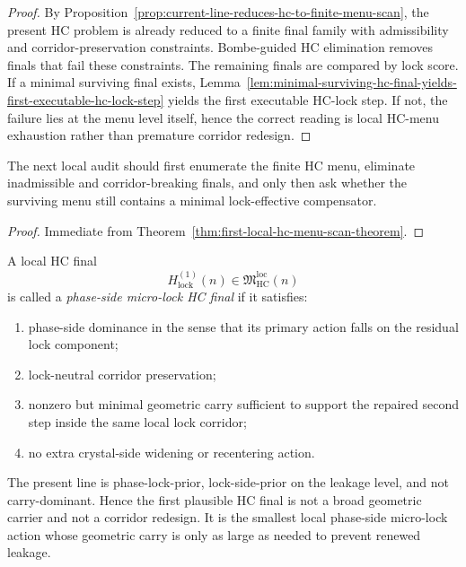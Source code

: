\begin{proof}
By Proposition~\ref{prop:current-line-reduces-hc-to-finite-menu-scan}, the present HC problem is already reduced to a finite final family with admissibility and corridor-preservation constraints. Bombe-guided HC elimination removes finals that fail these constraints. The remaining finals are compared by lock score. If a minimal surviving final exists, Lemma~\ref{lem:minimal-surviving-hc-final-yields-first-executable-hc-lock-step} yields the first executable HC-lock step. If not, the failure lies at the menu level itself, hence the correct reading is local HC-menu exhaustion rather than premature corridor redesign.
\end{proof}

\begin{corollary}
\label{cor:current-hc-menu-scan-working-rule}
The next local audit should first enumerate the finite HC menu, eliminate inadmissible and corridor-breaking finals, and only then ask whether the surviving menu still contains a minimal lock-effective compensator.
\end{corollary}

\begin{proof}
Immediate from Theorem~\ref{thm:first-local-hc-menu-scan-theorem}.
\end{proof}



\begin{definition}
\label{def:phase-side-micro-lock-hc-final}
A local HC final
\[
 H_{\mathrm{lock}}^{(1)}(n)\in \mathfrak M_{\mathrm{HC}}^{\mathrm{loc}}(n)
\]
is called a \emph{phase-side micro-lock HC final} if it satisfies:
\begin{enumerate}[leftmargin=2em,label=(\alph*)]
 \item phase-side dominance in the sense that its primary action falls on the residual lock component;
 \item lock-neutral corridor preservation;
 \item nonzero but minimal geometric carry sufficient to support the repaired second step inside the same local lock corridor;
 \item no extra crystal-side widening or recentering action.
\end{enumerate}
\end{definition}

\begin{remark}
\label{rem:why-this-is-the-first-plausible-hc-menu-entry}
The present line is phase-lock-prior, lock-side-prior on the leakage level, and not carry-dominant. Hence the first plausible HC final is not a broad geometric carrier and not a corridor redesign. It is the smallest local phase-side micro-lock action whose geometric carry is only as large as needed to prevent renewed leakage.
\end{remark}

